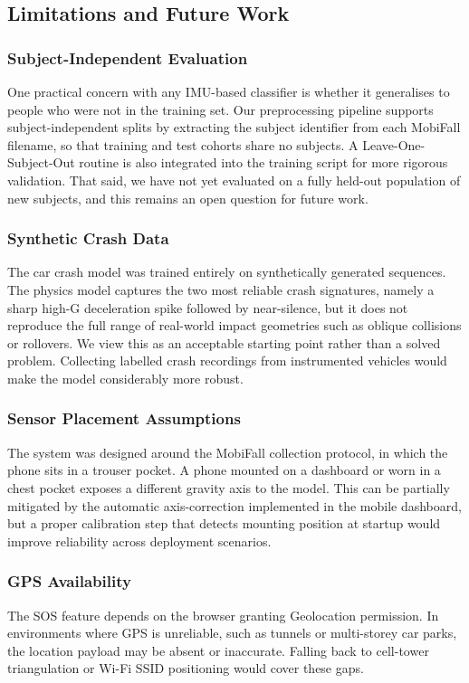 \documentclass[journal]{IEEEtran}
\begin{document}
\subsection{Limitations and Future Work}

\subsubsection{Subject-Independent Evaluation}
One practical concern with any IMU-based classifier is whether it generalises
to people who were not in the training set. Our preprocessing pipeline supports
subject-independent splits by extracting the subject identifier from each
MobiFall filename, so that training and test cohorts share no subjects. A
Leave-One-Subject-Out routine is also integrated into the training script for
more rigorous validation. That said, we have not yet evaluated on a fully held-out
population of new subjects, and this remains an open question for future work.

\subsubsection{Synthetic Crash Data}
The car crash model was trained entirely on synthetically generated sequences.
The physics model captures the two most reliable crash signatures, namely a
sharp high-G deceleration spike followed by near-silence, but it does not
reproduce the full range of real-world impact geometries such as oblique
collisions or rollovers. We view this as an acceptable starting point rather
than a solved problem. Collecting labelled crash recordings from instrumented
vehicles would make the model considerably more robust.

\subsubsection{Sensor Placement Assumptions}
The system was designed around the MobiFall collection protocol, in which the
phone sits in a trouser pocket. A phone mounted on a dashboard or worn in a
chest pocket exposes a different gravity axis to the model. This can be
partially mitigated by the automatic axis-correction implemented in the mobile
dashboard, but a proper calibration step that detects mounting position at
startup would improve reliability across deployment scenarios.

\subsubsection{GPS Availability}
The SOS feature depends on the browser granting Geolocation permission.
In environments where GPS is unreliable, such as tunnels or multi-storey car
parks, the location payload may be absent or inaccurate. Falling back to
cell-tower triangulation or Wi-Fi SSID positioning would cover these gaps.
\end{document}
